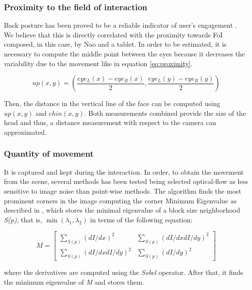\documentclass[a4paper, 10pt, conference]{ieeeconf}      %
\begin{document}
\subsubsection{Proximity to the field of interaction}
Back posture has been proved to be a reliable indicator of user's engagement \cite{d2007posture} \cite{castellano2009detecting}. We believe that this is directly correlated with the proximity towards FoI composed, in this case, by Nao and a tablet. In order to be estimated, it is necessary to compute the middle point between the eyes because it decreases the variability due to the movement like in equation \ref{eq:proximity}.

\small
\begin{equation} \label{eq:proximity}
up(x,y) = \left (\frac{eye_{L}(x)-eye_{R}(x)}{2}, \frac{eye_{L}(y)-eye_{R}(y)}{2}\right )
\end{equation}
\normalsize

Then, the distance in the vertical line of the face can be computed using $ up(x,y) $ and $ chin(x,y)$. Both measurements combined provide the size of the head and thus, a distance measurement with respect to the camera can approximated.

\subsubsection{Quantity of movement}
It is captured and kept during the interaction. In order, to obtain the movement from the scene, several methods has been tested being selected optical-flow as less sensitive to image noise than point-wise methods. The algorithm finds the most prominent corners in the image computing the corner Minimum Eigenvalue as described in \cite{shi1994good}, which stores the minimal eigenvalue of a block size neighborhood \textit{S(p)}, that is, $ \min(\lambda_1, \lambda_2) $ in terms of the following equation:

\begin{equation}
M =  \begin{bmatrix} 
		\sum _{S(p)}(dI/dx)^2 &  \sum _{S(p)}(dI/dx dI/dy)^2  \\ 
		\sum _{S(p)}(dI/dx dI/dy)^2 &  \sum _{S(p)}(dI/dy)^2 
	 \end{bmatrix}
\end{equation} 

where the derivatives are computed using the \textit{Sobel} operator. After that, it finds the minimum eigenvalue of \textit{M} and stores them.
\end{document}
